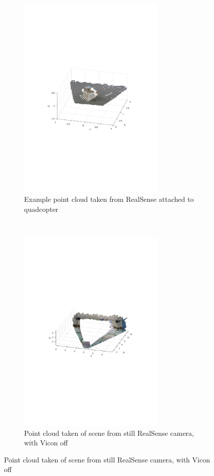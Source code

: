 \documentclass[12pt,a4paper]{article}
\begin{document}
    \begin{figure}[b!]
      \begin{subfigure}[t]{\textwidth}
      \centering
        \includegraphics[width=70mm, trim = 100 280 100 290, clip]{pc_investigation/MATLAB_a.pdf}
        \caption{Example point cloud taken from RealSense attached to quadcopter}
        \label{f: pcs quad}
      \end{subfigure}  \\
      \begin{subfigure}[t]{0.5\textwidth}
        \includegraphics[width=70mm, trim = 100 300 100 290, clip]{vicon_test/without.pdf}
        \caption{Point cloud taken of scene from still RealSense camera, with Vicon off}
      \end{subfigure} %

\end{figure}
\end{document}

